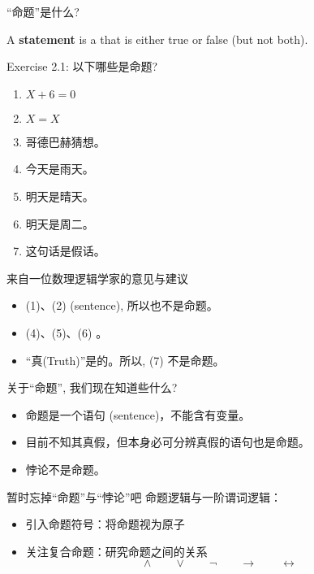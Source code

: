 
\begin{frame}{``命题''是什么?}
  \begin{definition}
    A \textbf{statement} is a  that is either true or false
    (but not both).
  \end{definition}

  \vspace{0.30cm}
  \pause
  \begin{exampleblock}{Exercise 2.1: 以下哪些是命题?}
    \begin{enumerate}
      \item $X + 6 = 0$
      \item $X = X$
      \item 哥德巴赫猜想。
      \item 今天是雨天。
      \item 明天是晴天。
      \item 明天是周二。
      \item 这句话是假话。
    \end{enumerate}
  \end{exampleblock}
\end{frame}

\begin{frame}{来自一位数理逻辑学家的意见与建议}
  \begin{itemize}
    \setlength{\itemsep}{8pt}
    \item<1-> (1)、(2)  (sentence), 所以也不是命题。
    \item<2-> (4)、(5)、(6) 。
    \item<3-> ``真(Truth)''是的。所以, (7) 不是命题。
  \end{itemize}

\end{frame}

\begin{frame}{关于``命题'', 我们现在知道些什么?}
  \begin{itemize}
    \setlength{\itemsep}{6pt}
    \item 命题是一个语句 (sentence)，不能含有变量。
    \item 目前不知其真假，但本身必可分辨真假的语句也是命题。
    \item 悖论不是命题。
  \end{itemize}
\end{frame}

\begin{frame}{暂时忘掉``命题''与``悖论''吧}
  命题逻辑与一阶谓词逻辑：
  \begin{itemize}
    \item 引入命题符号：将命题视为原子
    \item 关注复合命题：研究命题之间的关系 
      \[
	\land \qquad \lor \qquad \lnot \qquad \to \qquad \leftrightarrow
      \]
  \end{itemize}
\end{frame}
